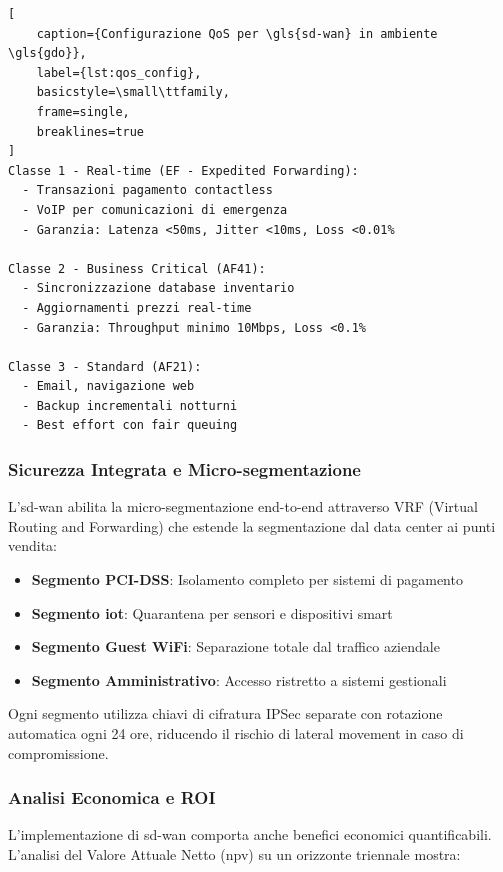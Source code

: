 \begin{lstlisting}[
    caption={Configurazione QoS per \gls{sd-wan} in ambiente \gls{gdo}},
    label={lst:qos_config},
    basicstyle=\small\ttfamily,
    frame=single,
    breaklines=true
]
Classe 1 - Real-time (EF - Expedited Forwarding):
  - Transazioni pagamento contactless
  - VoIP per comunicazioni di emergenza
  - Garanzia: Latenza <50ms, Jitter <10ms, Loss <0.01%

Classe 2 - Business Critical (AF41):
  - Sincronizzazione database inventario
  - Aggiornamenti prezzi real-time
  - Garanzia: Throughput minimo 10Mbps, Loss <0.1%

Classe 3 - Standard (AF21):
  - Email, navigazione web
  - Backup incrementali notturni
  - Best effort con fair queuing
\end{lstlisting}

\subsubsection{\texorpdfstring{\textbf{Sicurezza Integrata e Micro-segmentazione}}{3.3.1.4 - Sicurezza Integrata e Micro-segmentazione}}

L'\gls{sd-wan} abilita la micro-segmentazione end-to-end attraverso VRF (Virtual Routing and Forwarding) che estende la segmentazione dal data center ai punti vendita:

\begin{itemize}
    \item \textbf{Segmento PCI-DSS}: Isolamento completo per sistemi di pagamento
    \item \textbf{Segmento \gls{iot}}: Quarantena per sensori e dispositivi smart
    \item \textbf{Segmento Guest WiFi}: Separazione totale dal traffico aziendale
    \item \textbf{Segmento Amministrativo}: Accesso ristretto a sistemi gestionali
\end{itemize}

Ogni segmento utilizza chiavi di cifratura IPSec separate con rotazione automatica ogni 24 ore, riducendo il rischio di lateral movement in caso di compromissione.

\subsubsection{\texorpdfstring{\textbf{Analisi Economica e ROI}}{3.3.1.5 - Analisi Economica e ROI}}

L'implementazione di \gls{sd-wan} comporta anche benefici economici quantificabili. L'analisi del Valore Attuale Netto (\gls{npv}) su un orizzonte triennale mostra:

